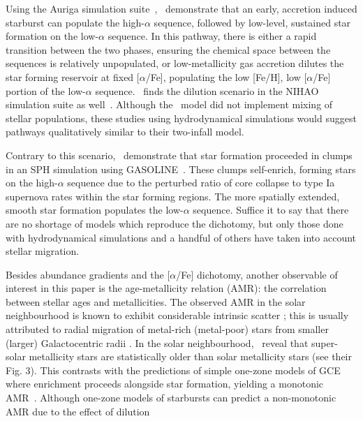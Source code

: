 \documentclass[fleqn, usenatbib]{mnras}
\begin{document}
Using the Auriga simulation suite~\citep{Grand2017},~\citet{Grand2018} 
demonstrate that an early, accretion induced starburst can populate the 
high-$\alpha$ sequence, followed by low-level, sustained star formation on the 
low-$\alpha$ sequence. In this pathway, there is either a rapid transition 
between the two phases, ensuring the chemical space between the sequences is 
relatively unpopulated, or low-metallicity gas accretion dilutes the star 
forming reservoir at fixed [$\alpha$/Fe], populating the low [Fe/H], low 
[$\alpha$/Fe] portion of the low-$\alpha$ sequence.~\citet{Buck2020b} finds 
the dilution scenario in the NIHAO simulation suite as well~\citep{Wang2015, 
Buck2020a}. Although the~\citet{Spitoni2021} model did not implement mixing of 
stellar populations, these studies using hydrodynamical simulations would 
suggest pathways qualitatively similar to their two-infall model. 
\par 
Contrary to this scenario,~\citet{Clarke2019} demonstrate that star formation 
proceeded in clumps in an SPH simulation using GASOLINE~\citep*{Wadsley2017}. 
These clumps self-enrich, forming stars on the high-$\alpha$ sequence due to 
the perturbed ratio of core collapse to type Ia supernova rates within the 
star forming regions. The more spatially extended, smooth star formation 
populates the low-$\alpha$ sequence. Suffice it to say that there are no 
shortage of models which reproduce the dichotomy, but only those done with 
hydrodynamical simulations and a handful of others 
\citep[e.g.][]{Schoenrich2009, Minchev2013, Sharma2020} have taken into account 
stellar migration. 
\par 
Besides abundance gradients and the [$\alpha$/Fe] dichotomy, another 
observable of interest in this paper is the age-metallicity relation (AMR): the 
correlation between stellar ages and metallicities. The observed AMR in the 
solar neighbourhood is known to exhibit considerable intrinsic scatter 
\citep{Edvardsson1993}; this is usually attributed to radial migration of 
metal-rich (metal-poor) stars from smaller (larger) Galactocentric radii 
\citep{Sellwood2002, Haywood2008, Roskar2008b, Schoenrich2009}. 
In the solar neighbourhood,~\citet{Feuillet2018} reveal that super-solar 
metallicity stars are statistically older than solar metallicity stars (see 
their Fig. 3). This contrasts with the predictions of simple one-zone models of 
GCE where enrichment proceeds alongside star formation, yielding a monotonic 
AMR~\citep[e.g.][]{Andrews2017, Weinberg2017}. Although one-zone models of 
starbursts can predict a non-monotonic AMR due to the effect of dilution 
\end{document}

